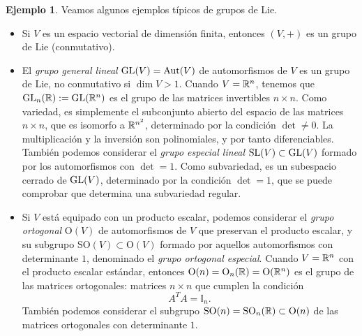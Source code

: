 \documentclass[11pt,a4paper]{amsbook}
\theoremstyle{remark} \newtheorem{rmk}[subsection]{Observación}
\theoremstyle{definition} \newtheorem{defn}[subsection]{Definición}
\theoremstyle{definition} \newtheorem{ex}[subsection]{Ejemplo}
\theoremstyle{definition} \newtheorem{ej}[subsection]{Ejercicio}
\begin{document}
\begin{ex}
Veamos algunos ejemplos típicos de grupos de Lie.
\begin{itemize}
\item Si $V$ es un espacio vectorial de dimensión finita, entonces $(V,+)$ es un grupo de Lie (conmutativo).
  \item El \emph{grupo general lineal}  $\operatorname{GL}(V)=\mathrm{Aut}(V)$ de automorfismos de $V$ es un grupo de Lie, no conmutativo si $\dim V > 1$. Cuando $V=\mathbb R^n$, tenemos que $\operatorname{GL}_n(\mathbb R):=\operatorname{GL}(\mathbb R^n)$ es el grupo de las matrices invertibles $n\times n$. Como variedad, es simplemente el subconjunto abierto del espacio de las matrices $n\times n$, que es isomorfo a $\mathbb R^{n^2}$, determinado por la condición $\det \neq 0$. La multiplicación y la inversión son polinomiales, y por tanto diferenciables. También podemos considerar el \emph{grupo especial lineal} $\mathrm{SL}(V)\subset \operatorname{GL}(V)$ formado por los automorfismos con $\det = 1$. Como subvariedad, es un subespacio cerrado de $\operatorname{GL}(V)$, determinado por la condición $\det = 1$, que se puede comprobar que determina una subvariedad regular.

  \item Si $V$ está equipado con un producto escalar, podemos considerar el \emph{grupo ortogonal} $\mathrm{O}(V)$ de automorfismos de $V$ que preservan el producto escalar, y su subgrupo $\mathrm{SO}(V)\subset \mathrm{O}(V)$ formado por aquellos automorfismos con determinante $1$, denominado el \emph{grupo ortogonal especial}. Cuando $V=\mathbb R^n$ con el producto escalar estándar, entonces $\mathrm{O}(n)=\mathrm{O}_n(\mathbb R)=\mathrm{O}(\mathbb R^n)$ es el grupo de las matrices ortogonales: matrices $n\times n$ que cumplen la condición
        \begin{equation*}
A^T A = \mathbb{I}_n.
        \end{equation*}
        También podemos considerar el subgrupo $\mathrm{SO}(n)=\mathrm{SO}_n(\mathbb R)\subset \mathrm{O}(n)$ de las matrices ortogonales con determinante $1$.


\end{itemize}
\end{ex}
\end{document}

